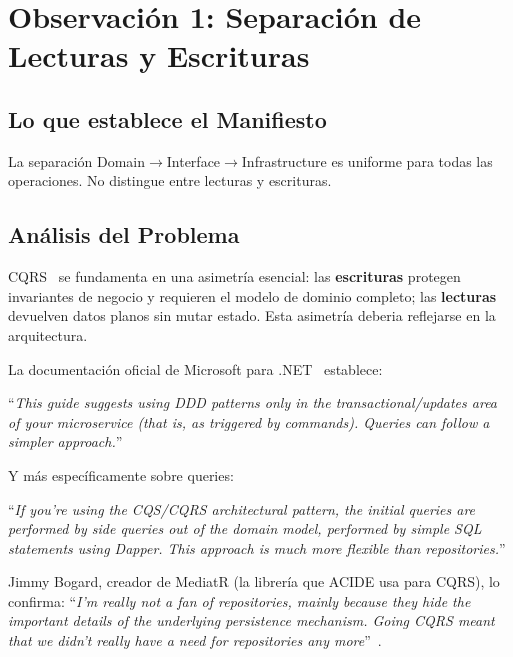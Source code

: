 \documentclass[conference]{IEEEtran}
\begin{document}
\section{Observaci\'on 1: Separaci\'on de Lecturas y Escrituras}
\label{sec:obs1}

\subsection{Lo que establece el Manifiesto}
La separaci\'on Domain$\to$Interface$\to$Infrastructure es uniforme para todas las operaciones. No distingue entre lecturas y escrituras.

\subsection{An\'alisis del Problema}

CQRS~\cite{young2010} se fundamenta en una asimetr\'ia esencial: las \textbf{escrituras} protegen invariantes de negocio y requieren el modelo de dominio completo; las \textbf{lecturas} devuelven datos planos sin mutar estado. Esta asimetr\'ia deberia reflejarse en la arquitectura.

\begin{contradictionbox}
La documentaci\'on oficial de Microsoft para .NET~\cite{microsoft2023} establece:

``\textit{This guide suggests using DDD patterns only in the transactional/updates area of your microservice (that is, as triggered by commands). Queries can follow a simpler approach.}''

Y m\'as espec\'ificamente sobre queries:

``\textit{If you're using the CQS/CQRS architectural pattern, the initial queries are performed by side queries out of the domain model, performed by simple SQL statements using Dapper. This approach is much more flexible than repositories.}''
\end{contradictionbox}

Jimmy Bogard, creador de MediatR (la librer\'ia que ACIDE usa para CQRS), lo confirma: ``\textit{I'm really not a fan of repositories, mainly because they hide the important details of the underlying persistence mechanism. Going CQRS meant that we didn't really have a need for repositories any more}''~\cite{bogard2012}.
\end{document}
